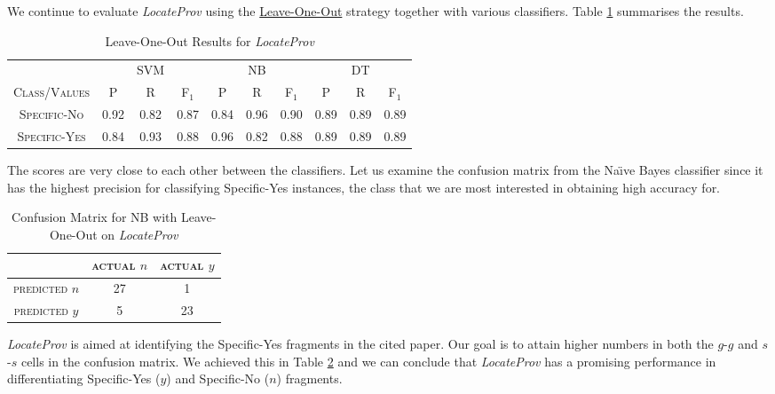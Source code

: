 We continue to evaluate {\it LocateProv} using the \url{Leave-One-Out} strategy together with various classifiers. Table \ref{tab:secondtieresults} summarises the results.

\begin{table}[h]
	\center
	\begin{tabular}{ c | c  c  c | c c c | c c c}
		& & SVM & & & NB & & & DT \\
		\textsc{Class/Values} & \textsc{P} & \textsc{R} & \textsc{F$_1$} & \textsc{P} & \textsc{R} & \textsc{F$_1$} & \textsc{P} & \textsc{R} & \textsc{F$_1$} \\
		\hline
		\textsc{Specific-No} 			& 0.92  &    0.82   &   0.87 & 0.84   &   0.96   &   0.90 & 0.89  &    0.89  &    0.89 \\
		\textsc{Specific-Yes} 			& 0.84  &    0.93   &   0.88 & 0.96   &   0.82   &   0.88 & 0.89  &    0.89  &    0.89 \\
	\end{tabular}
	\caption{Leave-One-Out Results for {\it LocateProv}}
	\label{tab:secondtieresults}
\end{table}
The scores are very close to each other between the classifiers. 
Let us examine the confusion matrix from the Na\"{\i}ve Bayes classifier since it has the highest precision for classifying Specific-Yes instances, the class that we are most interested in obtaining high accuracy for.

\begin{table}[h]
	\center
	\begin{tabular}{ c | c  c }
		 & \textsc{actual $n$} & \textsc{actual $y$} \\
		\hline
		\textsc{predicted $n$} 	& 27 & 1 \\
		\textsc{predicted $y$}		& 5 & 23
	\end{tabular}
	\caption{Confusion Matrix for NB with Leave-One-Out on {\it LocateProv}}
	\label{tab:secondnbconfusionmatrix}
\end{table}
{\it LocateProv} is aimed at identifying the Specific-Yes fragments in the cited paper. Our goal is to attain higher numbers in both the $g$-$g$ and $s$-$s$ cells in the confusion matrix. We achieved this in Table \ref{tab:secondnbconfusionmatrix} and we can conclude that {\it LocateProv} has a promising performance in differentiating Specific-Yes ($y$) and Specific-No ($n$) fragments.

